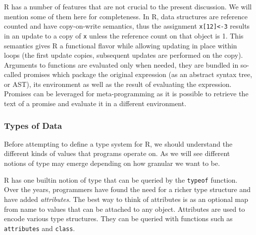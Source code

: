 \documentclass[acmsmall,review,anonymous]{acmart}\settopmatter{printfolios=true,printccs=false,printacmref=false}
\newcommand{\code}[1]{{\lstinline[style=Rin]!#1!}\xspace}
\begin{document}
R has a number of features that are not crucial to the present
discussion. We will mention some of them here for completeness.  In R, data
structures are reference counted and have copy-on-write semantics, thus the
assignment \code{x[12]<-3} results in an update to a copy of \code{x} unless
the reference count on that object is 1.  This semantics gives R a
functional flavor while allowing updating in place within loops (the first
update copies, subsequent updates are performed on the copy). Arguments to
functions are evaluated only when needed, they are bundled in so-called
promises which package the original expression (as an abstract syntax tree, or AST), its environment
as well as the result of evaluating the expression. Promises can be
leveraged for meta-programming as it is possible to retrieve the text of a
promise and evaluate it in a different environment.


\subsubsection{Types of Data}
\label{subsubsec:backgroundtypes}

Before attempting to define a type system for R, we should understand the
different kinds of values that programs operate on.  As we will see
different notions of type may emerge depending on how granular we want to
be.

\renewcommand{\k}[1]{{\tt #1}\xspace}

R has one builtin notion of type that can be queried by the \k{typeof}
function. Over the years, programmers have found the need for a richer type
structure and have added {\it attributes}. The best way to think of attributes is
as an optional map from name to values that can be attached to any object.
Attributes are used to encode various type structures. They can be queried
with functions such as \k{attributes} and \k{class}.
\end{document}
